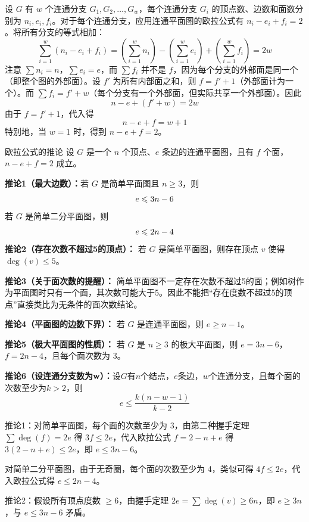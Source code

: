 \documentclass[lang=cn,11pt]{elegantbook}
\begin{document}
设 $G$ 有 $w$ 个连通分支 $G_1, G_2, \dots, G_w$，每个连通分支 $G_i$ 的顶点数、边数和面数分别为 $n_i, e_i, f_i$。对于每个连通分支，应用连通平面图的欧拉公式有 $n_i - e_i + f_i = 2$。将所有分支的等式相加：
\[
\sum_{i=1}^w (n_i - e_i + f_i) =\left(\sum_{i=1}^w n_i\right) - \left(\sum_{i=1}^w e_i\right) + \left(\sum_{i=1}^w f_i\right) = 2w
\]
注意 $\sum n_i = n$，$\sum e_i = e$，而 $\sum f_i$ 并不是 $f$，因为每个分支的外部面是同一个（即整个图的外部面）。设 $f'$ 为所有内部面之和，则 $f = f' + 1$（外部面计为一个）。而 $\sum f_i = f' + w$（每个分支有一个外部面，但实际共享一个外部面）。因此
\[
n - e + (f' + w) = 2w
\]
由于 $f = f' + 1$，代入得
\[
n - e + f = w + 1
\]
特别地，当 $w=1$ 时，得到 $n - e + f = 2$。
\begin{theorem}{欧拉公式的推论}
    设 $G$ 是一个 $n$ 个顶点、$e$ 条边的连通平面图，且有 $f$ 个面，$n-e+f=2$ 成立。

\textbf{推论1（最大边数）：}若 $G$ 是简单平面图且 $n \geqslant 3$，则\vspace{-10pt}
\[
e \leqslant 3n - 6\vspace{-10pt}
\]
若 $G$ 是简单二分平面图，则\vspace{-10pt}
\[
e \leqslant 2n - 4\vspace{-10pt}
\]
\textbf{推论2（存在次数不超过5的顶点）：}
若 $G$ 是简单平面图，则存在顶点 $v$ 使得 $\deg(v) \leqslant 5$。

\textbf{推论3（关于面次数的提醒）：}
简单平面图不一定存在次数不超过5的面；例如树作为平面图时只有一个面，其次数可能大于5。因此不能把“存在度数不超过5的顶点”直接类比为无条件的面次数结论。

\textbf{推论4（平面图的边数下界）：}
若 $G$ 是连通平面图，则 $e \geqslant n-1$。

\textbf{推论5（极大平面图的性质）：}
若 $G$ 是 $n \geqslant 3$ 的极大平面图，则 $e = 3n-6$，$f = 2n-4$，且每个面次数为 3。

\textbf{推论6（设连通分支数为w）：}设$G$有$n$个结点，$e$条边，$w$个连通分支，且每个面的次数至少为$k>2$，则\vspace{-10pt}\[e\leqslant \dfrac{k(n-w-1)}{k-2}\]
\end{theorem}
推论1：对简单平面图，每个面的次数至少为 3，由第二种握手定理 $\sum \deg(f) = 2e$ 得 $3f \leqslant 2e$，代入欧拉公式 $f = 2 - n + e$ 得 $3(2-n+e) \leqslant 2e$，即 $e \leqslant 3n-6$。

对简单二分平面图，由于无奇圈，每个面的次数至少为 4，类似可得 $4f \leqslant 2e$，代入欧拉公式得 $e \leqslant 2n-4$。

推论2：假设所有顶点度数 $\geqslant 6$，由握手定理 $2e = \sum \deg(v) \geqslant 6n$，即 $e \geqslant 3n$，与 $e \leqslant 3n-6$ 矛盾。
\end{document}
